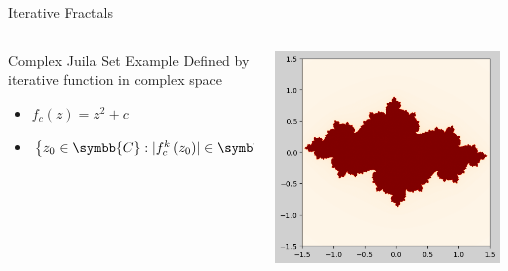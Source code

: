 \documentclass[aspectratio=169,t]{beamer}
\DeclarePairedDelimiter\abs{\lvert}{\rvert} %
\begin{document}
\begin{frame}[label={sec:org05a310b}]{Iterative Fractals}
\begin{columns}
\begin{column}{0.55\columnwidth}
\begin{block}{Complex Juila Set Example}
Defined by iterative function in complex space

\begin{itemize}
\item \(f_c (z) = z^2 + c\)

\item \(\left\{ z_0 \in \symbb{C}: \abs{f^k_c \left(z_0 \right)} \in \symbb{C} \text{ as } k \to \infty\right\} \in K_c\)
\end{itemize}
\end{block}
\end{column}

\begin{column}{0.45\columnwidth}
\begin{center}
\includegraphics[width=0.95\textwidth]{./Figs/Fig_2.png}
\end{center}
\end{column}
\end{columns}
\end{frame}
\end{document}
